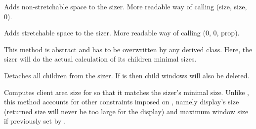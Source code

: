 


\label{wxsizeraddspacer}


Adds non-stretchable space to the sizer. More readable way of calling
(size, size, 0).


\label{wxsizeraddstretchspacer}


Adds stretchable space to the sizer. More readable way of calling
(0, 0, prop).


\label{wxsizercalcmin}


This method is abstract and has to be overwritten by any derived class.
Here, the sizer will do the actual calculation of its children minimal sizes.


\label{wxsizerclear}


Detaches all children from the sizer. If  is \true then child windows will also be deleted.


\label{wxsizercomputefittingclientsize}


Computes client area size for  so that it matches the 
sizer's minimal size. Unlike , this
method accounts for other constraints imposed on , namely display's
size (returned size will never be too large for the display) and maximum
window size if previously set by
.


